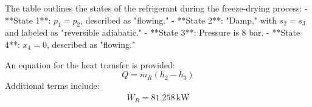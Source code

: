 The table outlines the states of the refrigerant during the freeze-drying process:  
- **State 1**: \( p_1 = p_2 \), described as "flowing."  
- **State 2**: "Damp," with \( s_2 = s_3 \) and labeled as "reversible adiabatic."  
- **State 3**: Pressure is 8 bar.  
- **State 4**: \( x_4 = 0 \), described as "flowing."  

An equation for the heat transfer is provided:  
\[
Q = \dot{m}_R (h_2 - h_3)
\]  
Additional terms include:  
\[
\dot{W}_R = 81.258 \, \text{kW}
\]